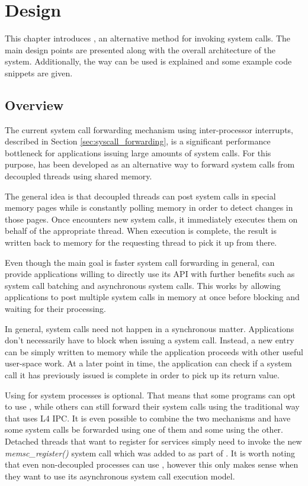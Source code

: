 \chapter{Design}
\label{chap:design}

This chapter introduces \emph{\memsc}, an alternative method for invoking
\llinux system calls. The main design points are presented along with the
overall architecture of the system. Additionally, the way \memsc can be used is
explained and some example code snippets are given.

\section{Overview}

The current system call forwarding mechanism using inter-processor interrupts,
described in Section \ref{sec:syscall_forwarding}, is a significant performance
bottleneck for applications issuing large amounts of system calls. For this
purpose, \emph{\memsc} has been developed as an alternative way to forward
system calls from decoupled \llinux threads using shared memory.

The general idea is that decoupled threads can post system calls in special
memory pages while \llinux is constantly polling memory in order to detect
changes in those pages. Once \llinux encounters new system calls, it
immediately executes them on behalf of the appropriate thread. When execution
is complete, the result is written back to memory for the requesting thread to
pick it up from there.

Even though the main goal is faster system call forwarding in general, \memsc
can provide applications willing to directly use its API with further benefits
such as system call batching and asynchronous system calls. This works by
allowing applications to post multiple system calls in memory at once before
blocking and waiting for their processing.

In general, system calls need not happen in a synchronous matter. Applications
don't necessarily have to block when issuing a system call. Instead, a new
entry can be simply written to memory while the application proceeds with other
useful user-space work. At a later point in time, the application can check if
a system call it has previously issued is complete in order to pick up its
return value.

Using \memsc for system processes is optional. That means that some programs
can opt to use \memsc, while others can still forward their system calls using
the traditional way that uses L4 IPC. It is even possible to combine the two
mechanisms and have some system calls be forwarded using one of them and some
using the other. Detached threads that want to register for \memsc services
simply need to invoke the new \emph{memsc\_register()} system call which was
added to \llinux as part of \memsc. It is worth noting that even non-decoupled
processes can use \memsc, however this only makes sense when they want to use
its asynchronous system call execution model.

